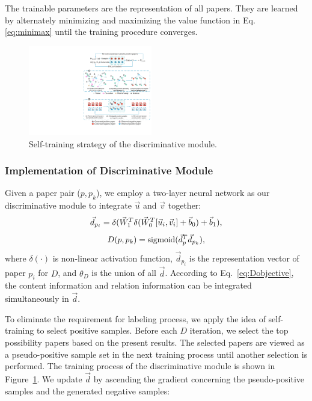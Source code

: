 \documentclass[letterpaper]{article}
\begin{document}
The trainable parameters are the representation of all papers. They are learned by alternately minimizing and maximizing the value function in Eq.~ \eqref{eq:minimax} until the training procedure converges.
\begin{figure}[t]
\centering
\includegraphics[width=0.48\textwidth]{D.pdf}
\caption{Self-training strategy of the discriminative module.}
\label{fig:D_framework}
\end{figure}
\subsubsection{Implementation of Discriminative Module}
Given a paper pair ($p, p_k$),
we employ a two-layer neural network as our discriminative module to integrate $\vec{u}$ and $\vec{v}$ together:
\begin{equation}
\centering
\vec{d}_{p_i}=\delta(\vec{W}_1^T\delta(\vec{W}_0^T[\vec{u}_i,\vec{v}_i]+\vec{b}_0)+\vec{b}_1),
\label{eq:d}
\end{equation}
\begin{equation}
\centering
D(p, p_k)=\text{sigmoid}(\vec{d}_{p}^T\vec{d}_{p_k}),
\label{eq:Dobjective}
\end{equation}
where $\delta(\cdot)$ is non-linear activation function, $\vec{d}_{p_i}$ is the representation vector of paper $p_i$ for $D$, and $\theta_D$ is the union of all $\vec{d}$.
According to Eq.~\eqref{eq:Dobjective}, the content information and relation information can be integrated simultaneously in $\vec{d}$.

To eliminate the requirement for labeling process, we apply the idea of self-training \cite{self1,self2} to select positive samples. Before each $D$ iteration, we select the top possibility papers based on the present results. The selected papers are viewed as a pseudo-positive sample set in the next training process until another selection is performed. The training process of the discriminative module is shown in Figure~\ref{fig:D_framework}.
We update $\vec{d}$ by ascending the gradient concerning the pseudo-positive samples and the generated negative samples:
\end{document}
